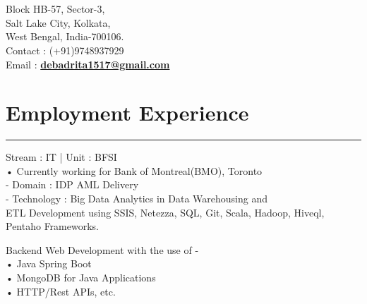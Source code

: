 \documentclass[]{DD_Resume_21}
\begin{document}
\begin{minipage}[t]{0.66\textwidth} 
\hspace*{0pt}\hfill    \\
\hspace*{0pt}\hfill    \\
\hspace*{0pt}\hfill Block HB-57, Sector-3, \\
\hspace*{0pt}\hfill Salt Lake City, Kolkata,\\
\hspace*{0pt}\hfill West Bengal, India-700106. \\
\hspace*{0pt}\hfill Contact : (+91)9748937929 \\
\hspace*{0pt}\hfill Email : \textbf{\href{mailto:debadrita1517@gmail.com}{debadrita1517@gmail.com}}
\section{Employment Experience}
\noindent\rule{12.5cm}{0.4pt}
 
\noindent
\hspace{5em}%
\begin{minipage}{0.85\textwidth\vspace{2pt}}
Stream : IT | Unit : BFSI\\
• Currently working for Bank of Montreal(BMO), Toronto\\
- Domain : IDP AML Delivery\\
- Technology : Big Data Analytics in Data Warehousing and\\ETL Development using SSIS, Netezza, SQL, Git, Scala, Hadoop, Hiveql, Pentaho Frameworks.
\end{minipage}
\sectionsep

 
\noindent
\hspace{5em}%
\begin{minipage}{0.85\textwidth\vspace{2pt}}
Backend Web Development with the use of -\\
• Java Spring Boot\\
• MongoDB for Java Applications\\
• HTTP/Rest APIs, etc.
\end{minipage}
\sectionsep


\end{minipage}
\end{document}
